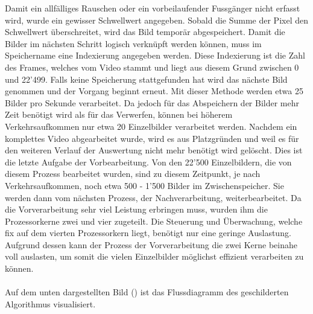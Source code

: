Damit ein allfälliges Rauschen oder ein vorbeilaufender Fussgänger nicht erfasst wird, wurde ein gewisser Schwellwert angegeben. Sobald die Summe der Pixel den Schwellwert überschreitet, wird das Bild temporär abgespeichert. Damit die Bilder im nächsten Schritt logisch verknüpft werden können, muss im Speichername eine Indexierung angegeben werden. Diese Indexierung ist die Zahl des Frames, welches vom Video stammt und liegt aus diesem Grund zwischen 0 und 22'499. Falls keine Speicherung stattgefunden hat wird das nächste Bild genommen und der Vorgang beginnt erneut. Mit dieser Methode werden etwa 25 Bilder pro Sekunde verarbeitet. Da jedoch für das Abspeichern der Bilder mehr Zeit benötigt wird als für das Verwerfen, können bei höherem Verkehrsaufkommen nur etwa 20 Einzelbilder verarbeitet werden. Nachdem ein komplettes Video abgearbeitet wurde, wird es aus Platzgründen und weil es für den weiteren Verlauf der Auswertung nicht mehr benötigt wird gelöscht. Dies ist die letzte Aufgabe der Vorbearbeitung. Von den 22'500 Einzelbildern, die von diesem Prozess bearbeitet wurden, sind zu diesem Zeitpunkt, je nach Verkehrsaufkommen, noch etwa 500 - 1'500 Bilder im Zwischenspeicher. Sie werden dann vom nächsten Prozess, der Nachverarbeitung, weiterbearbeitet. Da die Vorverarbeitung sehr viel Leistung erbringen muss, wurden ihm die Prozessorkerne zwei und vier zugeteilt. Die Steuerung und Überwachung, welche fix auf dem vierten Prozessorkern liegt, benötigt nur eine geringe Auslastung. Aufgrund dessen kann der Prozess der Vorverarbeitung die zwei Kerne beinahe voll auslasten, um somit die vielen Einzelbilder möglichst effizient verarbeiten zu können.\\\\
Auf dem unten dargestellten Bild () ist das Flussdiagramm des geschilderten Algorithmus visualisiert.

